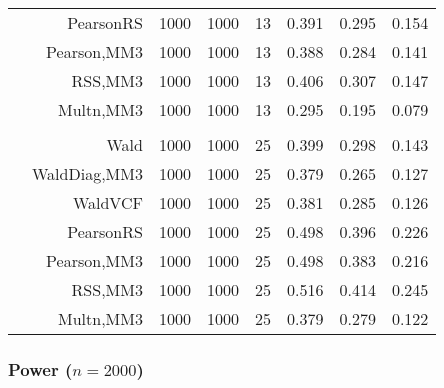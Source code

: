 \documentclass[
]{article}
\begin{document}
\begin{table}[H]
{\begin{tabular}[t]{lrrrrrrr}
\hspace{1em} & PearsonRS & 1000 & 1000 & 13 & 0.391 & 0.295 & 0.154\\

\hspace{1em} & Pearson,MM3 & 1000 & 1000 & 13 & 0.388 & 0.284 & 0.141\\

\hspace{1em} & RSS,MM3 & 1000 & 1000 & 13 & 0.406 & 0.307 & 0.147\\

\hspace{1em} & Multn,MM3 & 1000 & 1000 & 13 & 0.295 & 0.195 & 0.079\\
\cmidrule{1-8}
\addlinespace[0.3em]
\multicolumn{8}{l}{\textbf{3F 15V}}\\
\hspace{1em} & Wald & 1000 & 1000 & 25 & 0.399 & 0.298 & 0.143\\

\hspace{1em} & WaldDiag,MM3 & 1000 & 1000 & 25 & 0.379 & 0.265 & 0.127\\

\hspace{1em} & WaldVCF & 1000 & 1000 & 25 & 0.381 & 0.285 & 0.126\\

\hspace{1em} & PearsonRS & 1000 & 1000 & 25 & 0.498 & 0.396 & 0.226\\

\hspace{1em} & Pearson,MM3 & 1000 & 1000 & 25 & 0.498 & 0.383 & 0.216\\

\hspace{1em} & RSS,MM3 & 1000 & 1000 & 25 & 0.516 & 0.414 & 0.245\\

\hspace{1em} & Multn,MM3 & 1000 & 1000 & 25 & 0.379 & 0.279 & 0.122\\
\bottomrule
\end{tabular}}
\endgroup{}
\end{table}

\hypertarget{power-n2000}{%
\subsubsection{\texorpdfstring{Power
(\(n=2000\))}{Power (n=2000)}}\label{power-n2000}}
\end{document}
